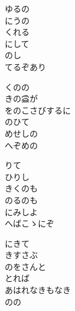 \documentclass[10pt,b5j]{tarticle} %
\begin{document}
\vspace{1.5em} %
\newcommand{\linespace}{0.5em} %
\newcommand{\blocksize}{0.5\hsize} %
\begin{enumerate} %
    \begin{minipage}[c]{\blocksize}
    
        \vspace{\linespace}
        \item
        ゆるの\\
        にうの\\
        くれる\\
        にして\\
        のし\\
        てるぞあり
        
        \vspace{\linespace}
        \item
        くのの\\
        きの益が\\
        をのこさびするに\\
        のひて\\
        めせしの\\
        へぞめの
        
        \vspace{\linespace}
        \item
        りて\\
        ひりし\\
        きくのも\\
        のるのも\\
        にみしよ\\
        へばこゝにぞ
        
        \vspace{\linespace}
        \item
        にきて\\
        きすさぶ\\
        のをさんと\\
        とれば\\
        あはれなきもなき\\
        のの
        

\end{minipage}
\end{enumerate}
\end{document}
